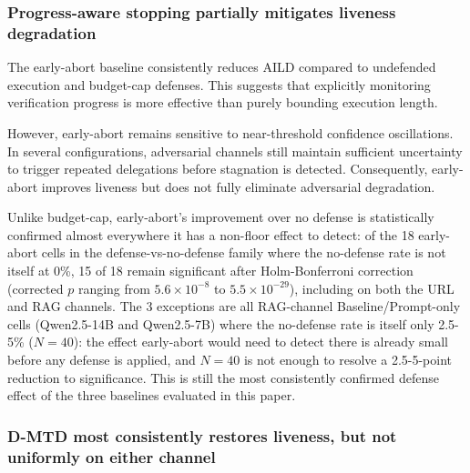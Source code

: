 \documentclass[conference]{IEEEtran}
\begin{document}
\subsubsection{Progress-aware stopping partially mitigates liveness degradation}

The early-abort baseline consistently reduces AILD compared
to undefended execution and budget-cap defenses. This
suggests that explicitly monitoring verification progress is
more effective than purely bounding execution length.

However, early-abort remains sensitive to near-threshold
confidence oscillations. In several configurations, adversarial
channels still maintain sufficient uncertainty to trigger
repeated delegations before stagnation is detected.
Consequently, early-abort improves liveness but does not
fully eliminate adversarial degradation.

Unlike budget-cap, early-abort's improvement over no defense is statistically confirmed almost everywhere it has a non-floor effect to detect: of the 18 early-abort cells in the defense-vs-no-defense family where the no-defense rate is not itself at 0\%, 15 of 18 remain significant after Holm-Bonferroni correction (corrected $p$ ranging from $5.6\times10^{-8}$ to $5.5\times10^{-29}$), including on both the URL and RAG channels. The 3 exceptions are all RAG-channel Baseline/Prompt-only cells (Qwen2.5-14B and Qwen2.5-7B) where the no-defense rate is itself only 2.5-5\% ($N=40$): the effect early-abort would need to detect there is already small before any defense is applied, and $N=40$ is not enough to resolve a 2.5-5-point reduction to significance. This is still the most consistently confirmed defense effect of the three baselines evaluated in this paper.

\subsubsection{D-MTD most consistently restores liveness, but not uniformly on either channel}
\end{document}
